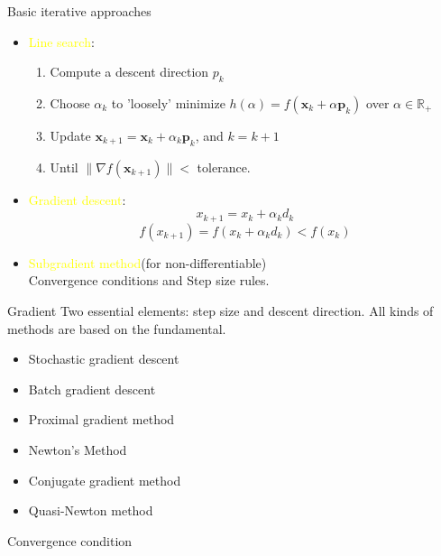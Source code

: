     \begin{frame}{Basic iterative approaches}
      \begin{itemize}
        \item \textcolor{yellow}{Line search}:
        \begin{enumerate}
          \item Compute a descent direction $p_k$
          \item Choose $ \displaystyle \alpha _{k} $ to 'loosely' minimize $ h(\alpha )=f(\mathbf {x} _{k}+\alpha \mathbf {p} _{k}) $ over $ \alpha \in \mathbb {R} _{+}$
          \item Update $ \mathbf {x} _{k+1}=\mathbf {x} _{k}+\alpha _{k}\mathbf {p} _{k} $, and $ {\textstyle k=k+1} $
          \item Until $ \|\nabla f(\mathbf {x} _{k+1})\| <$ tolerance.
        \end{enumerate}

        \item \textcolor{yellow}{Gradient descent}:
        \[x_{k+1}=x_k+\alpha_k d_k\]
        \[f(x_{k+1}) = f(x_k+\alpha_k d_k) < f(x_k)\]
        \item \textcolor{yellow}{Subgradient method}(for non-differentiable)
        \\
        Convergence conditions and Step size rules.
      \end{itemize}
    \end{frame}

    \begin{frame}{Gradient}
      Two essential elements: step size and descent direction. All kinds of methods are based on the fundamental.
      \begin{itemize}
        \item Stochastic gradient descent
        \item Batch gradient descent
        \item Proximal gradient method
        \item Newton's Method
        \item Conjugate gradient method
        \item Quasi-Newton method
      \end{itemize}
      Convergence condition
    \end{frame}

